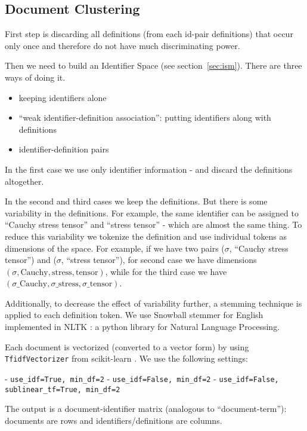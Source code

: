 \subsection{Document Clustering} \label{sec:clustering-impl}

First step is discarding all definitions (from each id-pair definitions)
that occur only once and therefore do not have much discriminating power. 

Then we need to build an Identifier Space (see section~\ref{sec:ism}). 
There are three ways of doing it.

\begin{itemize}
  \item keeping identifiers alone
  \item ``weak identifier-definition association'': putting identifiers along with definitions
  \item identifier-definition pairs 
\end{itemize}

In the first case we use only identifier information - and discard the 
definitions altogether.

In the second and third cases we keep the definitions. 
But there is some variability in the definitions. For example, 
the same identifier can be assigned to ``Cauchy stress tensor'' and
``stress tensor'' - which are almost the same thing. To reduce 
this variability we tokenize the definition and use individual tokens
as dimensions of the space. For example, if we have two pairs
($\sigma$, ``Cauchy stress tensor'') and ($\sigma$, ``stress tensor''),
for second case we have dimensions $(\sigma, \text{Cauchy}, \text{stress}, \text{tensor})$,
while for the third case we have 
$(\sigma\text{\_Cauchy}, \sigma\text{\_stress}, \sigma\text{\_tensor})$.


Additionally, to decrease the effect of variability further, 
a stemming technique is applied to each definition token. 
We use Snowball stemmer for English \cite{porter2001snowball} 
implemented in NLTK \cite{bird2006nltk}: 
a python library for Natural Language Processing. 

Each document is vectorized (converted to a vector form) by using
\verb|TfidfVectorizer| from  scikit-learn \cite{scikit-learn}. 
We use the following settings: 

- \verb|use_idf=True, min_df=2|
- \verb|use_idf=False, min_df=2|
- \verb|use_idf=False, sublinear_tf=True, min_df=2|

The output is a document-identifier matrix (analogous to ``document-term''):
documents are rows and identifiers/definitions are columns. 

